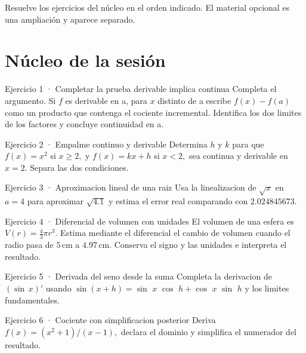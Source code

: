 \documentclass[10pt,a4paper,oneside,openany]{book}
\begin{document}
Resuelve los ejercicios del núcleo en el orden indicado. El material opcional es una ampliación y aparece separado.
\section*{Núcleo de la sesión}
\begin{PSevenExerciseFixed}{Ejercicio 1 · Completar la prueba derivable implica continua}
Completa el argumento. Si \(f\) es derivable en a, para \(x\) distinto de a escribe \(f(x)-f(a)\) como un producto que contenga el cociente incremental. Identifica los dos limites de los factores y concluye continuidad en a.
\end{PSevenExerciseFixed}
\begin{PSevenExerciseFixed}{Ejercicio 2 · Empalme continuo y derivable}
Determina \(h\) y \(k\) para que \(f(x)=x^{2}\) si \(x\ge 2,\) y \(f(x)=kx+h\) si \(x<2,\) sea continua y derivable en \(x=2\). Separa las dos condiciones.
\end{PSevenExerciseFixed}
\begin{PSevenExerciseFixed}{Ejercicio 3 · Aproximacion lineal de una raiz}
Usa la linealizacion de \(\sqrt{x}\) en \(a=4\) para aproximar \(\sqrt{4.1}\) y estima el error real comparando con \(2.024845673\).
\end{PSevenExerciseFixed}
\begin{PSevenExerciseFixed}{Ejercicio 4 · Diferencial de volumen con unidades}
El volumen de una esfera es \(V(r)=\tfrac43\pi r^3\). Estima mediante el diferencial el cambio de volumen cuando el radio pasa de \(5\,\mathrm{cm}\) a \(4.97\,\mathrm{cm}\). Conserva el signo y las unidades e interpreta el resultado.
\end{PSevenExerciseFixed}
\begin{PSevenExerciseFixed}{Ejercicio 5 · Derivada del seno desde la suma}
Completa la derivacion de \((\sin\,x)'\) usando \(\sin(x+h)=\sin\) \(x\) \(\cos\) \(h+\cos\) \(x\) \(\sin\) \(h\) y los limites fundamentales.
\end{PSevenExerciseFixed}
\begin{PSevenExerciseFixed}{Ejercicio 6 · Cociente con simplificacion posterior}
Deriva \(f(x)=(x^{2}+1)/(x-1),\) declara el dominio y simplifica el numerador del resultado.
\end{PSevenExerciseFixed}
\end{document}
